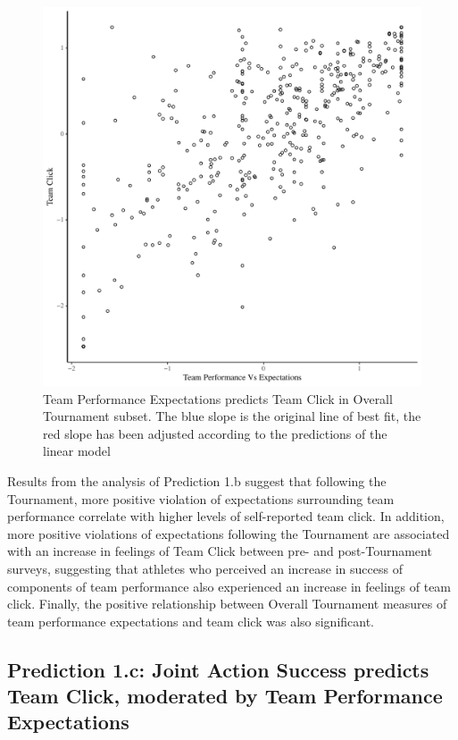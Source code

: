    \begin{figure}[htbp]
     \centering
   \includegraphics[scale=.5]{images/teamPerfClickOverallBasicXY.pdf}
     \caption{Team Performance Expectations predicts Team Click in Overall Tournament subset. The blue slope is the original line of best fit, the red slope has been adjusted according to the predictions of the linear model}
     \label{fig:teamPerfClickOverallModelSlope}
   \end{figure}

Results from the analysis of Prediction 1.b suggest that following the Tournament, more positive violation of expectations surrounding team performance correlate with higher levels of self-reported team click.  In addition, more positive violations of expectations following the Tournament are associated with an increase in feelings of Team Click between pre- and post-Tournament surveys, suggesting that athletes who perceived an increase in success of components of team performance also experienced an increase in feelings of team click.  Finally, the positive relationship between Overall Tournament measures of team performance expectations and team click was also significant.




\subsection{Prediction 1.c: Joint Action Success predicts Team Click, moderated by Team Performance Expectations}

